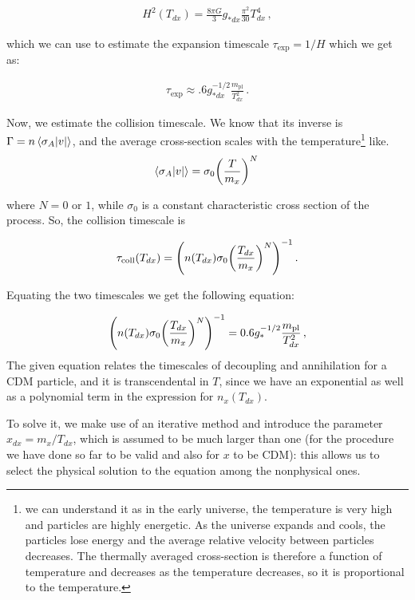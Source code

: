 \begin{align}
    H^2 (T_{dx}) = \frac{8 \pi G}{3} g_{*dx} \frac{\pi^2}{30} T_{dx}^{4} \,,
\end{align}

which we can use to estimate the expansion timescale \(\tau_{\text{exp}}= 1/H\) which we get as:

\begin{align}
    \tau_{\text{exp}} \approx \num{.6} g_{*dx}^{-1/2} \frac{m _{\text{pl}}}{T_{dx}^2} \,.
\end{align}

\hspace{0.5cm}Now, we estimate the collision timescale. We know that its inverse is \(\Gamma = n \expval{\sigma _A \abs{v}}\), and the average cross-section scales with the temperature\footnote{we can understand it as in the early universe, the temperature is very high and particles are highly energetic. As the universe expands and cools, the particles lose energy and the average relative velocity between particles decreases. The thermally averaged cross-section is therefore a function of temperature and decreases as the temperature decreases, so it is proportional to the temperature. } like. 
\begin{align}
    \expval{\sigma _A \abs{v}} = \sigma_0 \qty(\frac{T}{m_x})^{N}\,
\end{align}


where \(N = 0\) or \(1\), while \(\sigma_0 \) is a constant characteristic cross section of the process. So, the collision timescale is

\begin{align}
    \tau _{\text{coll}} (T_{dx}) = \qty(n(T_{dx}) \sigma _0 \qty(\frac{T_{dx}}{m_x})^{N})^{-1}\,.
\end{align}

Equating the two timescales we get the following equation:

\begin{align}
    \qty(n(T_{dx}) \sigma _0 \qty(\frac{T_{dx}}{m_x})^{N})^{-1} = \num{.6} g_{*}^{-1/2} \frac{m_{\text{pl}}}{T_{dx}^2}\,,
\end{align}
The given equation relates the timescales of decoupling and annihilation for a CDM particle, and it is transcendental in \(T\), since we have an exponential as well as a polynomial term in the expression for \(n_x(T_{dx})\).

\hspace{0.5cm} To solve it, we make use of an iterative method and introduce the parameter  \(x_{dx} = m_x / T_{dx}\), which is assumed to be much larger than one (for the procedure we have done so far to be valid and also for \(x\) to be CDM): this allows us to select the physical solution to the equation among the nonphysical ones. 

